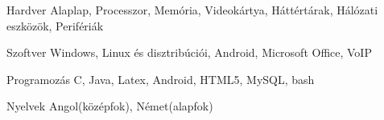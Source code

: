 

\begin{cvskills}

  \cvskill
    {Hardver} %
    {Alaplap, Processzor, Memória, Videokártya, Háttértárak, Hálózati eszközök, Perifériák} %

  \cvskill
    {Szoftver} %
    {Windows, Linux és disztribúciói, Android, Microsoft Office, VoIP} %

  \cvskill
    {Programozás} %
    {C, Java, Latex, Android, HTML5, MySQL, bash} %

  \cvskill
	{Nyelvek} %
	{Angol(középfok), Német(alapfok)} %

\end{cvskills}
